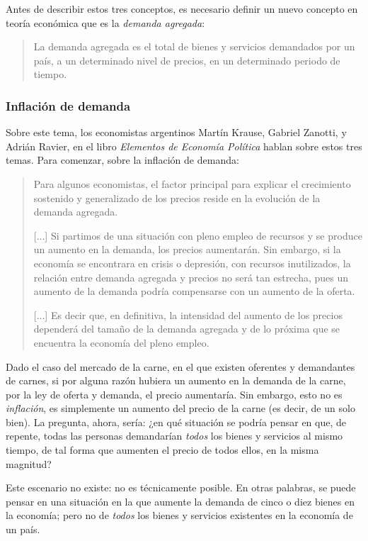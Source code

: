 \documentclass[12pt,a4paper,twoside]{book}
\begin{document}
Antes de describir estos tres conceptos, es necesario definir un nuevo concepto en teoría económica que es la \textit{demanda agregada}:

\begin{quotation}
La demanda agregada es el total de bienes y servicios demandados por un país, a un determinado nivel de precios, en un determinado periodo de tiempo. \cite{epedia:da}
\end{quotation}

\subsubsection{Inflación de demanda}
Sobre este tema, los economistas argentinos Martín Krause,  Gabriel Zanotti, y Adrián Ravier, en el libro \textit{Elementos de Economía Política} hablan sobre estos tres temas. Para comenzar, sobre la inflación de demanda:

\begin{quotation}
Para algunos economistas, el factor principal para explicar el crecimiento sostenido y generalizado de los precios reside en la evolución de la demanda agregada.

[...] Si partimos de una situación con pleno empleo de recursos y se produce un aumento en la demanda, los precios aumentarán. Sin embargo, si la economía se encontrara en crisis o depresión, con recursos inutilizados, la relación entre demanda agregada y precios no será tan estrecha, pues un aumento de la demanda podría compensarse con un aumento de la oferta. 

[...] Es decir que, en definitiva, la intensidad del aumento de los precios dependerá del tamaño de la demanda agregada y de lo próxima que se encuentra la economía del pleno empleo. \cite[pág. 465]{elementos-econopol}
\end{quotation}

Dado el caso del mercado de la carne, en el que existen oferentes y demandantes de carnes, si por alguna razón hubiera un aumento en la demanda de la carne, por la ley de oferta y demanda, el precio aumentaría. Sin embargo, esto no es \textit{inflación}, es simplemente un aumento del precio de la carne (es decir, de un solo bien). La pregunta, ahora, sería: ¿en qué situación se podría pensar en que, de repente, todas las personas demandarían \textit{todos} los bienes y servicios al mismo tiempo, de tal forma que aumenten el precio de todos ellos, en la misma magnitud? 

Este escenario no existe: no es técnicamente posible. En otras palabras, se puede pensar en una situación en la que aumente la demanda de cinco o diez bienes en la economía; pero no de \textit{todos} los bienes y servicios existentes en la economía de un país.
\end{document}
